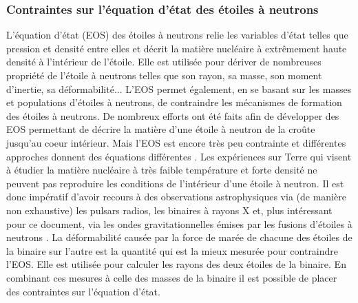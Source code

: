 \subsubsection*{Contraintes sur l'équation d'état des étoiles à neutrons}
\label{sec:EOS}
L'équation d'état (EOS) des étoiles à neutrons relie les variables d'état telles que pression et densité entre elles et décrit la matière nucléaire à extrêmement haute densité à l'intérieur de l'étoile.
Elle est utilisée pour dériver de nombreuses propriété de l'étoile à neutrons telles que son rayon, sa masse, son moment d'inertie, sa déformabilité...
L'EOS permet également, en se basant sur les masses et populations d'étoiles à neutrons, de contraindre les mécanismes de formation des étoiles à neutrons.
De nombreux efforts ont été faits afin de développer des EOS permettant de décrire la matière d'une étoile à neutron de la croûte jusqu'au coeur intérieur.
Mais l'EOS est encore très peu contrainte et différentes approches donnent des équations différentes \cite{EOS_Douchin_2001,EOS_Lattimer_2001}.
Les expériences sur Terre qui visent à étudier la matière nucléaire à très faible température et forte densité ne peuvent pas reproduire les conditions de l'intérieur d'une étoile à neutron.
Il est donc impératif d'avoir recours à des observations astrophysiques via (de manière non exhaustive) les pulsars radios, les binaires à rayons X et, plus intéressant pour ce document, via les ondes gravitationnelles émises par les fusions d'étoiles à neutrons \cite{EOS_gw170817,EOS_pulsar,EOS_Lattimer_2021}.
La déformabilité causée par la force de marée de chacune des étoiles de la binaire sur l'autre est la quantité qui est la mieux mesurée pour contraindre l'EOS.
Elle est utilisée pour calculer les rayons des deux étoiles de la binaire.
En combinant ces mesures à celle des masses de la binaire il est possible de placer des contraintes sur l'équation d'état.

